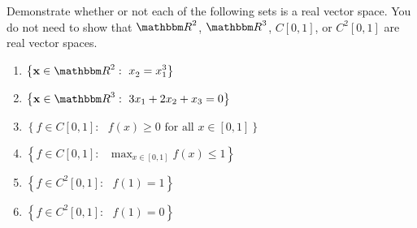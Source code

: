 Demonstrate whether or not each of the following sets is a real vector space. You do not need to show that $\R^2$, $\R^3$, $C[0,1]$, or $C^2[0,1]$ are real vector spaces.

\begin{enumerate}
\item $\displaystyle{\left\{\Bx \in \R^2 :\mbox{ }x_2^{} = x_1^3\right\}}$
\\
\item $\displaystyle{\left\{\Bx \in \R^3 :\mbox{ }3x_1 + 2x_2 + x_3 = 0\right\}}$
\\
\item $\displaystyle{\left\{f \in C[0,1]:\mbox{ }f(x) \ge 0\mbox{ for all }x\in [0,1]\right\}}$
\\
\item $\displaystyle{\left\{f \in C[0,1]:\mbox{ }\max_{x\in[0,1]} f(x) \le 1\right\}}$
\\
\item $\displaystyle{\left\{f \in C^2[0,1]:\mbox{ }f(1) = 1\right\}}$
\\
\item $\displaystyle{\left\{f \in C^2[0,1]:\mbox{ }f(1) = 0\right\}}$
\end{enumerate}



